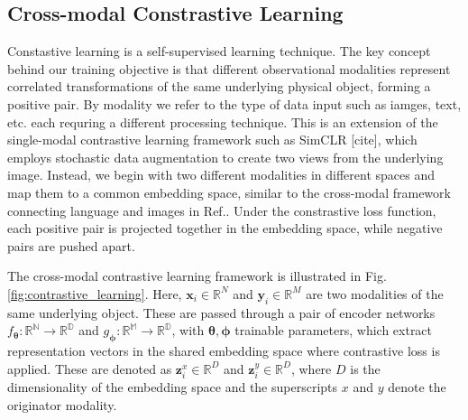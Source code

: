 \documentclass[a4paper,12pt]{article}
\begin{document}
\subsection{Cross-modal Constrastive Learning}
Constastive learning is a self-supervised learning technique.
The key concept behind our training objective is that different observational modalities represent correlated transformations of the same underlying physical object, forming a positive pair. By modality we refer to the type of data input such as iamges, text, etc. each requring a different processing technique. This is an extension of the single-modal contrastive learning framework such as SimCLR [cite], which employs stochastic data augmentation to create two views from the underlying image. Instead, we begin with two different modalities in different spaces and map them to a common embedding space, similar to the cross-modal framework connecting language and images in Ref.\cite{crossCLIP}. Under the constrastive loss function, each positive pair is projected together in the embedding space, while negative pairs are pushed apart.  

The cross-modal contrastive learning framework is illustrated in Fig.\ref{fig:contrastive_learning}. Here, $\mathbf{x}_i \in \mathbb{R}^N$ and $\mathbf{y}_i \in \mathbb{R}^M$ are two modalities of the same underlying object. These are passed through a pair of encoder networks $f_{\mathbf{\theta}}: \mathbb{R^N} \rightarrow \mathbb{R^D}$ and $g_{\mathbf{\phi}}: \mathbb{R^M} \rightarrow \mathbb{R^D}$, with $\mathbf{\theta}, \mathbf{\phi}$ trainable parameters, which extract representation vectors in the shared embedding space where contrastive loss is applied. These are denoted as $\mathbf{z}^x_i \in \mathbb{R}^D$ and $\mathbf{z}^y_i \in \mathbb{R}^D$, where $D$ is the dimensionality of the embedding space and the superscripts $x$ and $y$ denote the originator modality. 
\end{document}
